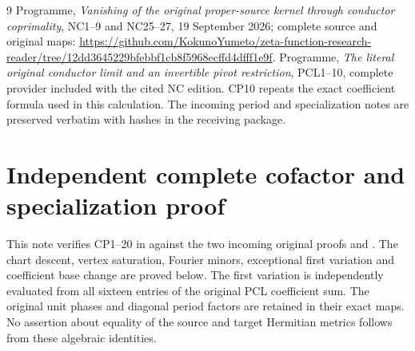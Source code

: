 \documentclass[11pt]{article}
\begin{document}
\begin{thebibliography}{9}
 Programme, \emph{Vanishing of the original proper-source
kernel through conductor coprimality}, NC1--9 and NC25--27,
19 September 2026; complete source and original maps:
\url{https://github.com/KokunoYumeto/zeta-function-research-reader/tree/12dd3645229bfebbf1cb8f5968ecffd4dfff1e9f}.
 Programme, \emph{The literal original conductor limit
and an invertible pivot restriction}, PCL1--10, complete provider
included with the cited NC edition. CP10 repeats the exact coefficient
formula used in this calculation. The incoming period and specialization
notes are preserved verbatim with hashes in the receiving package.
\end{thebibliography}

\endgroup

\clearpage\begingroup
\part*{Independent complete cofactor and specialization proof}
\newcommand{\pindcoC}{\mathbb C}
\newcommand{\pindcoim}{\operatorname{im}}
\newcommand{\pindcoSpec}{\operatorname{Spec}}
\newcommand{\pindcodiag}{\operatorname{diag}}
\newcommand{\pindcorank}{\operatorname{rank}}



This note verifies CP1--20 in
 against the two
incoming original proofs 
and . The chart descent,
vertex saturation, Fourier minors, exceptional first variation and
coefficient base change are proved below.  The first variation is
independently evaluated from all sixteen entries of the original PCL
coefficient sum.  The original unit phases and diagonal period factors
are retained in their exact maps.  No assertion about equality of
the source and target Hermitian metrics follows from these algebraic
identities.
\end{document}
